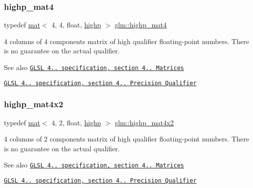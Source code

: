 \subsubsection{\texorpdfstring{highp\+\_\+mat4}{highp\_mat4}}
{\footnotesize\ttfamily typedef \hyperlink{structglm_1_1mat}{mat}$<$ 4, 4, float, \hyperlink{namespaceglm_a36ed105b07c7746804d7fdc7cc90ff25ac6f7eab42eacbb10d59a58e95e362074}{highp} $>$ \hyperlink{group__core__precision_gab46132805773d55f00fce859bc71e799}{glm\+::highp\+\_\+mat4}}

4 columns of 4 components matrix of high qualifier floating-\/point numbers. There is no guarantee on the actual qualifier.

\begin{DoxySeeAlso}{See also}
\href{http://www.opengl.org/registry/doc/GLSLangSpec.4.20.8.pdf}{\tt G\+L\+SL 4.. specification, section 4.. Matrices} 

\href{http://www.opengl.org/registry/doc/GLSLangSpec.4.20.8.pdf}{\tt G\+L\+SL 4.. specification, section 4.. Precision Qualifier} 
\end{DoxySeeAlso}
\mbox{\label{group__core__precision_ga0355949c79024224f7e9cfa06bc82153}} 
\subsubsection{\texorpdfstring{highp\+\_\+mat4x2}{highp\_mat4x2}}
{\footnotesize\ttfamily typedef \hyperlink{structglm_1_1mat}{mat}$<$ 4, 2, float, \hyperlink{namespaceglm_a36ed105b07c7746804d7fdc7cc90ff25ac6f7eab42eacbb10d59a58e95e362074}{highp} $>$ \hyperlink{group__core__precision_ga0355949c79024224f7e9cfa06bc82153}{glm\+::highp\+\_\+mat4x2}}

4 columns of 2 components matrix of high qualifier floating-\/point numbers. There is no guarantee on the actual qualifier.

\begin{DoxySeeAlso}{See also}
\href{http://www.opengl.org/registry/doc/GLSLangSpec.4.20.8.pdf}{\tt G\+L\+SL 4.. specification, section 4.. Matrices} 

\href{http://www.opengl.org/registry/doc/GLSLangSpec.4.20.8.pdf}{\tt G\+L\+SL 4.. specification, section 4.. Precision Qualifier} 
\end{DoxySeeAlso}
\mbox{\label{group__core__precision_ga20620a62fd7d4e020e772c4d258cf2e4}} 
